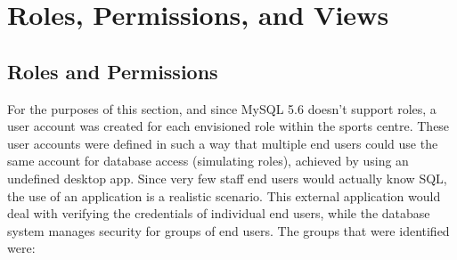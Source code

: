 \documentclass[a4paper, titlepage]{article}
\begin{document}
\section{Roles, Permissions, and Views} \label{sec:roles}
\subsection{Roles and Permissions}
For the purposes of this section, and since MySQL 5.6 doesn't support roles, a user account was created for each envisioned role within the sports centre. These user accounts were defined in such a way that multiple end users could use the same account for database access (simulating roles), achieved by using an undefined desktop app. Since very few staff end users would actually know SQL, the use of an application is a realistic scenario. This external application would deal with verifying the credentials of individual end users, while the database system manages security for groups of end users. The groups that were identified were:
\end{document}
